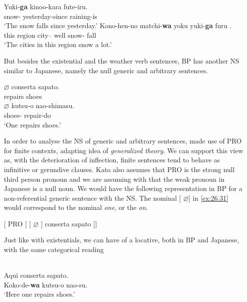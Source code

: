 \documentclass[output=paper]{langsci/langscibook}
\begin{document}
\ea%
    \label{ex:26.29}
    \ea
	\gll	Yuki-\textbf{ga}   kinoo-kara         fute-iru.\\
            snow-\Nom{} yesterday-since  raining-is\\
	\glt	\enquote*{The snow falls since yesterday.}
    \ex
	\gll	Kono-hen-no matchi-\textbf{wa}  yoku yuki-\textbf{ga}      furu .\\
            {this region} city–\Topic{} well snow-\Nom{}  fall\\
	\glt	\enquote*{The cities in this region snow a lot.}
    \z
\z

But besides the existential and the weather verb sentences,
\gls{BP} has another NS similar to Japanese, namely
the null generic and arbitrary sentences.

\ea%
    \label{ex:26.30}
    \ea
	\gll	$\varnothing$ conserta sapato.\\
			{}  repairs shoes\\
    \ex
	\gll	$\varnothing$ kutsu-o       nao-shimasu.\\
            {}  shoes-\Acc{}   repair-do\\
	\glt	\enquote*{One repairs shoes.}
    \z
\z

In order to analyse the NS of generic and arbitrary sentences, \citet{Kato2000}
made use of PRO for finite contexts, adapting  idea of
\emph{generalized  theory}.  We can support this view as, with the
deterioration of inflection, finite sentences tend to behave as infinitive or
gerundive clauses. Kato also assumes that PRO is the strong null third person
pronoun and we are assuming with \citet{Tomioka2003} that the weak pronoun in
Japanese is a null noun. We would have the following representation in
\gls{BP} for a non-referential generic sentence with
the NS.  The nominal [ $\varnothing$] in \eqref{ex:26.31} would
correspond to the  nominal \emph{one}, or the 
\emph{on.}

\ea%
    \label{ex:26.31}
    {}[ PRO [ [ $\varnothing$ ] conserta sapato ]]
\z

Just like with existentials, we can have  of a locative, both in
\gls{BP}  and Japanese, with the same categorical
reading

\ea%
    \label{ex:26.36bp}
    \ea{}\\
        Aqui conserta sapato.
    \ex{}\\
        Koko-de-\textbf{wa}  kutsu-o nao-su.\\
        ‘Here one repairs shoes.’
    \z
\z
\end{document}
